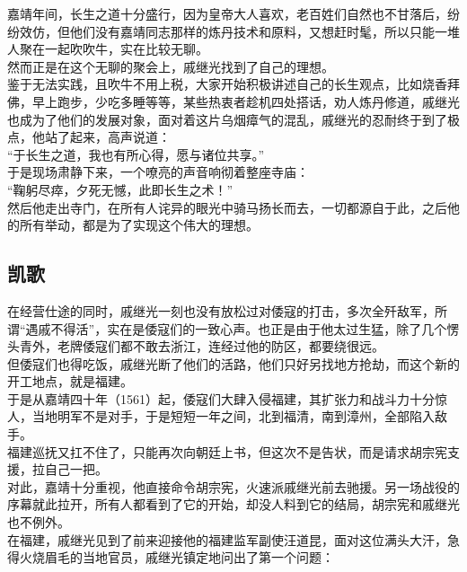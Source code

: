 \begin{multicols}{\theparacolNo}
嘉靖年间，长生之道十分盛行，因为皇帝大人喜欢，老百姓们自然也不甘落后，纷纷效仿，但他们没有嘉靖同志那样的炼丹技术和原料，又想赶时髦，所以只能一堆人聚在一起吹吹牛，实在比较无聊。\\

然而正是在这个无聊的聚会上，戚继光找到了自己的理想。\\

鉴于无法实践，且吹牛不用上税，大家开始积极讲述自己的长生观点，比如烧香拜佛，早上跑步，少吃多睡等等，某些热衷者趁机四处搭话，劝人炼丹修道，戚继光也成为了他们的发展对象，面对着这片乌烟瘴气的混乱，戚继光的忍耐终于到了极点，他站了起来，高声说道：\\

“于长生之道，我也有所心得，愿与诸位共享。”\\

于是现场肃静下来，一个嘹亮的声音响彻着整座寺庙：\\

“鞠躬尽瘁，夕死无憾，此即长生之术！”\\

然后他走出寺门，在所有人诧异的眼光中骑马扬长而去，一切都源自于此，之后他的所有举动，都是为了实现这个伟大的理想。\\

\subsection{凯歌}
在经营仕途的同时，戚继光一刻也没有放松过对倭寇的打击，多次全歼敌军，所谓“遇戚不得活”，实在是倭寇们的一致心声。也正是由于他太过生猛，除了几个愣头青外，老牌倭寇们都不敢去浙江，连经过他的防区，都要绕很远。\\

但倭寇们也得吃饭，戚继光断了他们的活路，他们只好另找地方抢劫，而这个新的开工地点，就是福建。\\

于是从嘉靖四十年（1561）起，倭寇们大肆入侵福建，其扩张力和战斗力十分惊人，当地明军不是对手，于是短短一年之间，北到福清，南到漳州，全部陷入敌手。\\

福建巡抚又扛不住了，只能再次向朝廷上书，但这次不是告状，而是请求胡宗宪支援，拉自己一把。\\

对此，嘉靖十分重视，他直接命令胡宗宪，火速派戚继光前去驰援。另一场战役的序幕就此拉开，所有人都看到了它的开始，却没人料到它的结局，胡宗宪和戚继光也不例外。\\

在福建，戚继光见到了前来迎接他的福建监军副使汪道昆，面对这位满头大汗，急得火烧眉毛的当地官员，戚继光镇定地问出了第一个问题：\\


\end{multicols}
